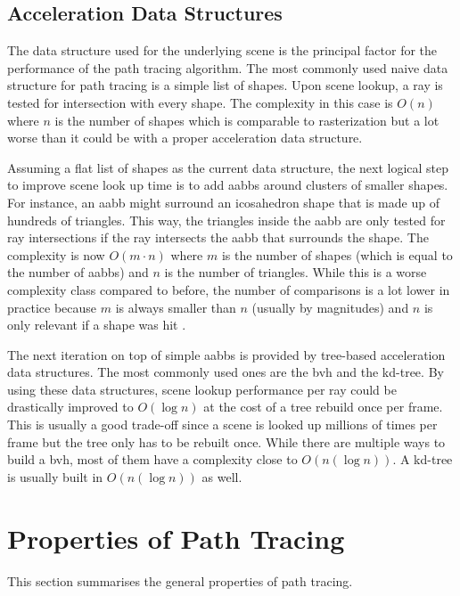 \documentclass[
  twoside,
  11pt, a4paper,
  footinclude=true,
  headinclude=true,
  cleardoublepage=empty
]{scrreprt}
\begin{document}
\subsection{Acceleration Data Structures}
The data structure used for the underlying scene is the principal factor for the performance of the
path tracing algorithm. The most commonly used naive data structure for path tracing is a simple
list of shapes. Upon scene lookup, a ray is tested for intersection with every shape. The
complexity in this case is \(O(n)\) where \(n\) is the number of shapes which is comparable to rasterization but a lot worse than it
could be with a proper acceleration data structure.

Assuming a flat list of shapes as the current data structure, the next logical step to improve
scene look up time is to add \acp{aabb} around clusters of smaller shapes. For instance, an
\ac{aabb} might surround an icosahedron shape that is made up of hundreds of triangles. This way,
the triangles inside the \ac{aabb} are only tested for ray intersections if the ray intersects the
\ac{aabb} that surrounds the shape. The complexity is now \(O(m \cdot n)\) where \(m\) is the number
of shapes (which is equal to the number of \acp{aabb}) and \(n\) is the number of triangles. While
this is a worse complexity class compared to before, the number of comparisons is a lot lower in
practice because \(m\) is always smaller than \(n\) (usually by magnitudes) and \(n\) is only
relevant if a shape was hit .

The next iteration on top of simple \acp{aabb} is provided by tree-based acceleration data
structures. The most commonly used ones are the \ac{bvh} and the kd-tree. By using these data
structures, scene lookup performance per ray could be drastically improved to \(O(\log n)\) at the
cost of a tree rebuild once per frame. This is usually a good trade-off since a scene is looked up
millions of times per frame but the tree only has to be rebuilt once. While there are multiple
ways to build a \ac{bvh}, most of them have a complexity close to \(O(n(\log n))\). A kd-tree is
usually built in \(O(n(\log n))\) as well.

\section{Properties of Path Tracing}
This section summarises the general properties of path tracing.
\end{document}
